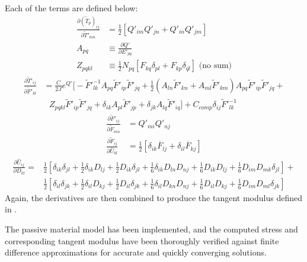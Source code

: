 Each of the terms are defined below:
\begin{align}
\frac{\partial (\tilde{T}_p)_{ij}}{\partial \tilde{T}'_{mn}} &= \frac{1}{2}\left[Q'_{im}Q'_{jn} + Q'_{in}Q'_{jm}\right] \\
A_{pq} &\equiv \frac{\partial Q'}{\partial E'_{pq}} \\
Z_{pqkl} &\equiv \frac{1}{2}N_{pq}\left[F_{kq}\delta_{pl} + F_{kp}\delta_{ql}\right] \text{ (no sum)}
\end{align}
\begin{equation}
\begin{aligned}
\frac{\partial \tilde{T}'_{ij}}{\partial \tilde{F}'_{kl}} &= \frac{C}{2J}e^{Q'} \Bigg[-\tilde{F}'^{-1}_{lk}A_{pq}\tilde{F}'_{ip}\tilde{F}'_{jq} + \frac{1}{2}(A_{ln}\tilde{F}'_{kn} + A_{ml}\tilde{F}'_{km})A_{pq}\tilde{F}'_{ip}\tilde{F}'_{jq} + \\
&\text{\ \ \ }Z_{pqkl}\tilde{F}'_{ip}\tilde{F}'_{jq} + \delta_{ik}A_{pl}\tilde{F}'_{jp} + \delta_{jk}A_{lq}\tilde{F}'_{iq}\Bigg] + C_{comp}\delta_{ij}\tilde{F}'^{-1}_{lk}
\end{aligned}
\end{equation}
\begin{align}
\frac{\partial \tilde{F}'_{ij}}{\partial \tilde{F}_{mn}} &= Q'_{mi}Q'_{nj} \\
\frac{\partial \tilde{F}_{ij}}{\partial \hat{U}_{kl}} &= \frac{1}{2}\left[\delta_{ik}\overline{F}_{lj} + \delta_{il}\overline{F}_{kj}\right]
\end{align}
\begin{equation}
\begin{aligned}
\frac{\partial \hat{U}_{ij}}{\partial D_{kl}} = &\frac{1}{2}\left[\delta_{ik}\delta_{jl} + \frac{1}{2}\delta_{ik}D_{lj} + \frac{1}{2}D_{ik}\delta_{jl} + \frac{1}{6}\delta_{ik}D_{ln}D_{nj} + \frac{1}{6}D_{ik}D_{lj} + \frac{1}{6}D_{im}D_{mk}\delta_{jl}\right] + \\
&\frac{1}{2}\left[\delta_{il}\delta_{jk} + \frac{1}{2}\delta_{il}D_{kj} + \frac{1}{2}D_{il}\delta_{jk} + \frac{1}{6}\delta_{il}D_{kn}D_{nj} + \frac{1}{6}D_{il}D_{kj} + \frac{1}{6}D_{im}D_{ml}\delta_{jk}\right]
\end{aligned}
\end{equation}
Again, the derivatives are then combined to produce the tangent modulus defined in .

The passive material model has been implemented, and the computed stress and corresponding tangent modulus have been thoroughly verified against finite difference approximations for accurate and quickly converging solutions.

